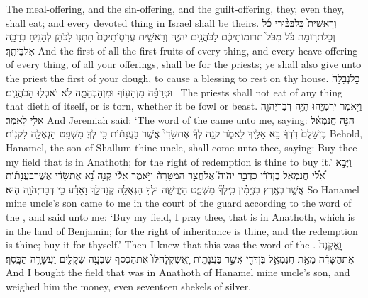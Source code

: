 {The meal-offering, and the sin-offering, and the guilt-offering, they, even they, shall eat; and every devoted thing in Israel shall be theirs.}
{וְרֵאשִׁית֩ כׇּל\maqqaf בִּכּ֨וּרֵי כֹ֜ל וְכׇל\maqqaf תְּר֣וּמַת כֹּ֗ל מִכֹּל֙ תְּרוּמ֣וֹתֵיכֶ֔ם לַכֹּהֲנִ֖ים יִהְיֶ֑ה וְרֵאשִׁ֤ית עֲרִסֽוֹתֵיכֶם֙ תִּתְּנ֣וּ לַכֹּהֵ֔ן לְהָנִ֥יחַ בְּרָכָ֖ה אֶל\maqqaf בֵּיתֶֽךָ׃}
{And the first of all the first-fruits of every thing, and every heave-offering of every thing, of all your offerings, shall be for the priests; ye shall also give unto the priest the first of your dough, to cause a blessing to rest on thy house.}
{כׇּל\maqqaf נְבֵלָה֙ וּטְרֵפָ֔ה מִן\maqqaf הָע֖וֹף וּמִן\maqqaf הַבְּהֵמָ֑ה לֹ֥א יֹאכְל֖וּ הַכֹּהֲנִֽים׃ \petucha }
{The priests shall not eat of any thing that dieth of itself, or is torn, whether it be fowl or beast.}
\label{haft_32}
\setcounter{chap}{32}
\setcounter{verse}{6}
{וַיֹּ֖אמֶר יִרְמְיָ֑הוּ הָיָ֥ה דְבַר\maqqaf יְהֹוָ֖ה אֵלַ֥י לֵאמֹֽר׃}
{And Jeremiah said: ‘The word of the \lord\space came unto me, saying:}
{הִנֵּ֣ה חֲנַמְאֵ֗ל בֶּן\maqqaf שַׁלֻּם֙ דֹּֽדְךָ֔ בָּ֥א אֵלֶ֖יךָ לֵאמֹ֑ר קְנֵ֣ה לְךָ֗ אֶת\maqqaf שָׂדִי֙ אֲשֶׁ֣ר בַּעֲנָת֔וֹת כִּ֥י לְךָ֛ מִשְׁפַּ֥ט הַגְּאֻלָּ֖ה לִקְנֽוֹת׃}
{Behold, Hanamel, the son of Shallum thine uncle, shall come unto thee, saying: Buy thee my field that is in Anathoth; for the right of redemption is thine to buy it.’}
{וַיָּבֹ֣א אֵ֠לַ֠י חֲנַמְאֵ֨ל בֶּן\maqqaf דֹּדִ֜י כִּדְבַ֣ר יְהֹוָה֮ אֶל\maqqaf חֲצַ֣ר הַמַּטָּרָה֒ וַיֹּ֣אמֶר אֵלַ֡י קְנֵ֣ה נָ֠א אֶת\maqqaf שָׂדִ֨י אֲשֶׁר\maqqaf בַּעֲנָת֜וֹת אֲשֶׁ֣ר \legarmeh  בְּאֶ֣רֶץ בִּנְיָמִ֗ין כִּֽי\maqqaf לְךָ֞ מִשְׁפַּ֧ט הַיְרֻשָּׁ֛ה וּלְךָ֥ הַגְּאֻלָּ֖ה קְנֵה\maqqaf לָ֑ךְ וָאֵדַ֕ע כִּ֥י דְבַר\maqqaf יְהֹוָ֖ה הֽוּא׃}
{So Hanamel mine uncle’s son came to me in the court of the guard according to the word of the \lord, and said unto me: ‘Buy my field, I pray thee, that is in Anathoth, which is in the land of Benjamin; for the right of inheritance is thine, and the redemption is thine; buy it for thyself.’ Then I knew that this was the word of the \lord.}
{וָֽאֶקְנֶה֙ אֶת\maqqaf הַשָּׂדֶ֔ה מֵאֵ֛ת חֲנַמְאֵ֥ל בֶּן\maqqaf דֹּדִ֖י אֲשֶׁ֣ר בַּעֲנָת֑וֹת וָֽאֶשְׁקְלָה\maqqaf לּוֹ֙ אֶת\maqqaf הַכֶּ֔סֶף שִׁבְעָ֥ה שְׁקָלִ֖ים וַעֲשָׂרָ֥ה הַכָּֽסֶף׃}
{And I bought the field that was in Anathoth of Hanamel mine uncle’s son, and weighed him the money, even seventeen shekels of silver.}
